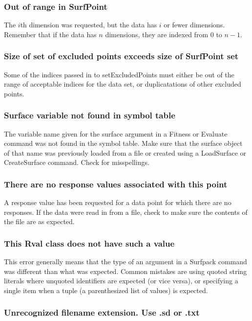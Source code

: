 \documentclass{article}
\begin{document}
\subsubsection{Out of range in SurfPoint}
The $i$th dimension was requested, but the data has $i$ or fewer dimensions.  Remember that if the data has $n$ dimensions, they are indexed from 0 to $n-1$.

\subsubsection{Size of set of excluded points exceeds size of SurfPoint set}
Some of the indices passed in to setExcludedPoints must either be out of the range of acceptable indices for the data set, or duplicatations of other excluded points.

\subsubsection{Surface variable not found in symbol table}
The variable name given for the surface argument in a Fitness or Evaluate command was not found in the symbol table.  Make sure that the surface object of that name was previously loaded from a file or created using a LoadSurface or CreateSurface command.  Check for misspellings.
\subsubsection{There are no response values associated with this point}
A response value has been requested for a data point for which there are no responses.  If the data were read in from a file, check to make sure the contents of the file are as expected.

\subsubsection{This Rval class does not have such a value}
This error generally means that the type of an argument in a Surfpack command was different than what was expected.  Common mistakes are using quoted string literals where unquoted identifiers are expected (or vice versa), or specifying a single item when a tuple (a parenthesized list of values) is expected.

\subsubsection{Unrecognized filename extension.  Use .sd or .txt}
\end{document}

